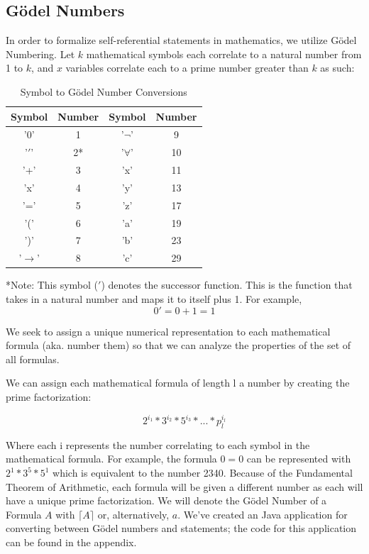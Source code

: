\documentclass[conference]{IEEEtran}
\begin{document}
\subsection{Gödel Numbers}
In order to formalize self-referential statements in mathematics, we utilize Gödel Numbering. Let $k$ mathematical symbols each correlate to a natural number from 1 to $k$, and $x$ variables correlate each to a prime number greater than $k$ as such:
\begin{table}[htbp]
\caption{Symbol to Gödel Number Conversions}
\begin{center}
\begin{tabular}{ |c|c||c|c| } 
 \hline
 Symbol & Number & Symbol & Number \\ 
 \hline
 \hline
 '0' & 1 & '$\neg$' & 9 \\ 
 \hline
 '$'$' & 2* & '$\forall$' & 10 \\ 
 \hline 
 '+' & 3 & 'x' & 11 \\ 
 \hline
 'x' & 4 & 'y' & 13 \\ 
 \hline
 '=' & 5 & 'z' & 17 \\ 
 \hline
 '(' & 6 & 'a' & 19 \\ 
 \hline
 ')' & 7 & 'b' & 23 \\ 
 \hline
 '$\rightarrow$' & 8 & 'c' & 29 \\ 
 \hline
 
\end{tabular}
\end{center}
\begin{center}
    *Note: This symbol ($'$) denotes the successor function. This is the function that takes in a natural number and maps it to itself plus 1. For example, \[0' = 0 + 1 = 1\]
    
\end{center}
\end{table}

We seek to assign a unique numerical representation to each mathematical formula (aka. number them) so that we can analyze the properties of the set of all formulas.

We can assign each mathematical formula of length l a number by creating the prime factorization: 

\[2^{i_1}*3^{i_2}*5^{i_3}*...*p_l^{i_l}\] 

Where each i represents the number correlating to each symbol in the mathematical formula. For example, the formula $0=0$ can be represented with $2^1*3^5*5^1$ which is equivalent to the number 2340. Because of the Fundamental Theorem of Arithmetic, each formula will be given a different number as each will have a unique prime factorization. We will denote the Gödel Number of a Formula $A$ with $\lceil A \rceil$ or, alternatively, $a$. We've created an Java application for converting between Gödel numbers and statements; the code for this application can be found in the appendix. 
\end{document}
